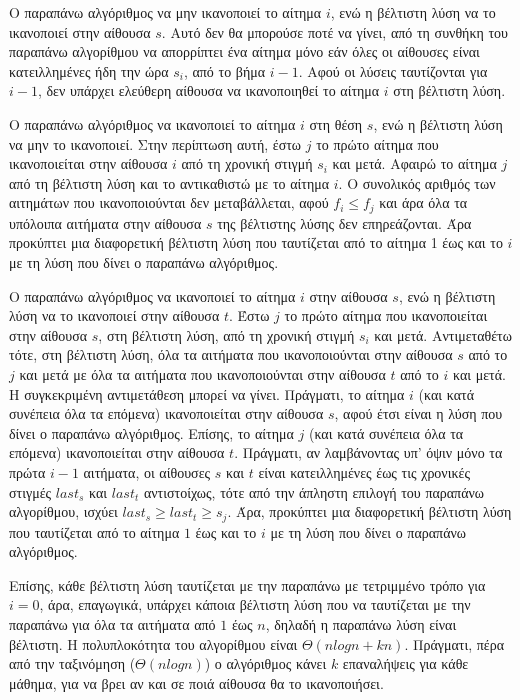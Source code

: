 \documentclass[12pt]{article}
\newenvironment{b_item}{
\begin{itemize}
  \setlength{\itemsep}{0pt}
  \setlength{\parskip}{0pt}
  \setlength{\parsep}{0pt}
}{\end{itemize}}
\begin{document}
\begin{b_item}
\item Ο παραπάνω αλγόριθμος να μην ικανοποιεί το αίτημα $i$, ενώ η βέλτιστη λύση να το ικανοποιεί στην αίθουσα $s$. Αυτό δεν θα μπορούσε ποτέ να γίνει, από τη συνθήκη του παραπάνω αλγορίθμου να απορρίπτει ένα αίτημα μόνο εάν όλες οι αίθουσες είναι κατειλλημένες ήδη την ώρα $s_i$, από το βήμα $i-1$. Αφού οι λύσεις ταυτίζονται για $i-1$, δεν υπάρχει ελεύθερη αίθουσα να ικανοποιηθεί το αίτημα $i$ στη βέλτιστη λύση.
\item Ο παραπάνω αλγόριθμος να ικανοποιεί το αίτημα $i$ στη θέση $s$, ενώ η βέλτιστη λύση να μην το ικανοποιεί. Στην περίπτωση αυτή, έστω $j$ το πρώτο αίτημα που ικανοποιείται στην αίθουσα $i$ από τη χρονική στιγμή $s_i$ και μετά. Αφαιρώ το αίτημα $j$ από τη βέλτιστη λύση και το αντικαθιστώ με το αίτημα $i$. Ο συνολικός αριθμός των αιτημάτων που ικανοποιούνται δεν μεταβάλλεται, αφού $f_i\leq f_j$ και άρα όλα τα υπόλοιπα αιτήματα στην αίθουσα $s$ της βέλτιστης λύσης δεν επηρεάζονται. Άρα προκύπτει μια διαφορετική βέλτιστη λύση που ταυτίζεται από το αίτημα 1 έως και το $i$ με τη λύση που δίνει ο παραπάνω αλγόριθμος.
\item O παραπάνω αλγόριθμος να ικανοποιεί το αίτημα $i$ στην αίθουσα $s$, ενώ η βέλτιστη λύση να το ικανοποιεί στην αίθουσα $t$. Έστω $j$ το πρώτο αίτημα που ικανοποιείται στην αίθουσα $s$, στη βέλτιστη λύση, από τη χρονική στιγμή $s_i$ και μετά. Αντιμεταθέτω τότε, στη βέλτιστη λύση, όλα τα αιτήματα που ικανοποιούνται στην αίθουσα $s$ από το $j$ και μετά με όλα τα αιτήματα που ικανοποιούνται στην αίθουσα $t$ από το $i$ και μετά. Η συγκεκριμένη αντιμετάθεση μπορεί να γίνει. Πράγματι, το αίτημα $i$ (και κατά συνέπεια όλα τα επόμενα) ικανοποιείται στην αίθουσα $s$, αφού έτσι είναι η λύση που δίνει ο παραπάνω αλγόριθμος. Επίσης, το αίτημα $j$ (και κατά συνέπεια όλα τα επόμενα) ικανοποιείται στην αίθουσα $t$. Πράγματι, αν λαμβάνοντας υπ' όψιν μόνο τα πρώτα $i-1$ αιτήματα, οι αίθουσες $s$ και $t$ είναι κατειλλημένες έως τις χρονικές στιγμές $last_s$ και $last_t$ αντιστοίχως, τότε από την άπληστη επιλογή του παραπάνω αλγορίθμου, ισχύει $last_s\geq last_t\geq s_j$. Άρα, προκύπτει μια διαφορετική βέλτιστη λύση που ταυτίζεται από το αίτημα $1$ έως και το $i$ με τη λύση που δίνει ο παραπάνω αλγόριθμος.
\end{b_item}
Επίσης, κάθε βέλτιστη λύση ταυτίζεται με την παραπάνω με τετριμμένο τρόπο για $i=0$, άρα, επαγωγικά, υπάρχει κάποια βέλτιστη λύση που να ταυτίζεται με την παραπάνω για όλα τα αιτήματα από $1$ έως $n$, δηλαδή η παραπάνω λύση είναι βέλτιστη. Η πολυπλοκότητα του αλγορίθμου είναι $\Theta\left(nlogn+kn\right)$. Πράγματι, πέρα από την ταξινόμηση ($\Theta(nlogn)$) ο αλγόριθμος κάνει $k$ επαναλήψεις για κάθε μάθημα, για να βρει αν και σε ποιά αίθουσα θα το ικανοποιήσει.\\
\end{document}
